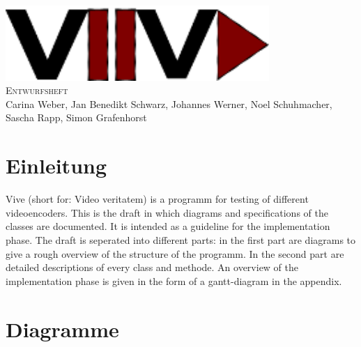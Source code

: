 \documentclass[twoside]{book}
\newcommand{\+}{\discretionary{\mbox{\scriptsize$\hookleftarrow$}}{}{}}
\newcommand{\clearemptydoublepage}{%
  \newpage{\pagestyle{empty}\cleardoublepage}%
}
\begin{document}
\hypersetup{pageanchor=false,
             bookmarks=true,
             bookmarksnumbered=true,
             pdfencoding=unicode
            }
\begin{titlepage}
\vspace*{7cm}
\begin{center}%
{\centering\includegraphics[width=10cm]{Logo.png}}\\
\vspace*{2cm}
\fontsize{40}{48} \selectfont \textsc{Entwurfsheft}\\
\vspace*{1cm}
\vspace*{0.5cm}
{\small Carina Weber, Jan Benedikt Schwarz, Johannes Werner, Noel Schuhmacher, Sascha Rapp, Simon Grafenhorst}\\
\end{center}
\end{titlepage}
\clearemptydoublepage
\tableofcontents
{}
\hypersetup{pageanchor=true}

\chapter{Einleitung}
Vive (short for: Video veritatem) is a programm for testing of different videoencoders. This is the draft in which diagrams and specifications of the classes are documented. It is intended as a guideline for the implementation phase.
The draft is seperated into different parts: in the first part are diagrams to give a rough overview of the structure of the programm. In the second part are detailed descriptions of every class and methode. An overview of the implementation phase is given in the form of a gantt-diagram in the appendix.
\chapter{Diagramme}
\end{document}
